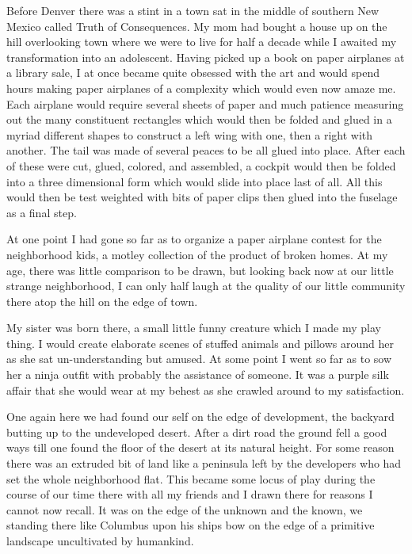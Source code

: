 \documentclass[ebook, 10pt, openright, onecolumn]{memoir}
\begin{document}
Before Denver there was a stint in a town sat in the middle of southern New
Mexico called Truth of Consequences.  My mom had bought a house up on the hill
overlooking town where we were to live for half a decade while I awaited my
transformation into an adolescent.  Having picked up a book on paper airplanes
at a library sale, I at once became quite obsessed with the art and would spend
hours making paper airplanes of a complexity which would even now amaze me.
Each airplane would require several sheets of paper and much patience measuring
out the many constituent rectangles which would then be folded and glued in a
myriad different shapes to construct a left wing with one, then a right with
another.  The tail was made of several peaces to be all glued into place.  After
each of these were cut, glued, colored, and assembled, a cockpit would then be
folded into a three dimensional form which would slide into place last of all.
All this would then be test weighted with bits of paper clips then glued into
the fuselage as a final step.

At one point I had gone so far as to organize a paper airplane contest for the
neighborhood kids, a motley collection of the product of broken homes.  At my
age, there was little comparison to be drawn, but looking back now at our little
strange neighborhood, I can only half laugh at the quality of our little
community there atop the hill on the edge of town.

My sister was born there, a small little funny creature which I made my play
thing.  I would create elaborate scenes of stuffed animals and pillows around
her as she sat un-understanding but amused.  At some point I went so far as to
sow her a ninja outfit with probably the assistance of someone.  It was a purple
silk affair that she would wear at my behest as she crawled around to my
satisfaction.

One again here we had found our self on the edge of development, the backyard
butting up to the undeveloped desert.  After a dirt road the ground fell a good
ways till one found the floor of the desert at its natural height.  For some
reason there was an extruded bit of land like a peninsula left by the developers
who had set the whole neighborhood flat.  This became some locus of play during
the course of our time there with all my friends and I drawn there for reasons I
cannot now recall.  It was on the edge of the unknown and the known, we standing
there like Columbus upon his ships bow on the edge of a primitive landscape
uncultivated by humankind.
\end{document}
